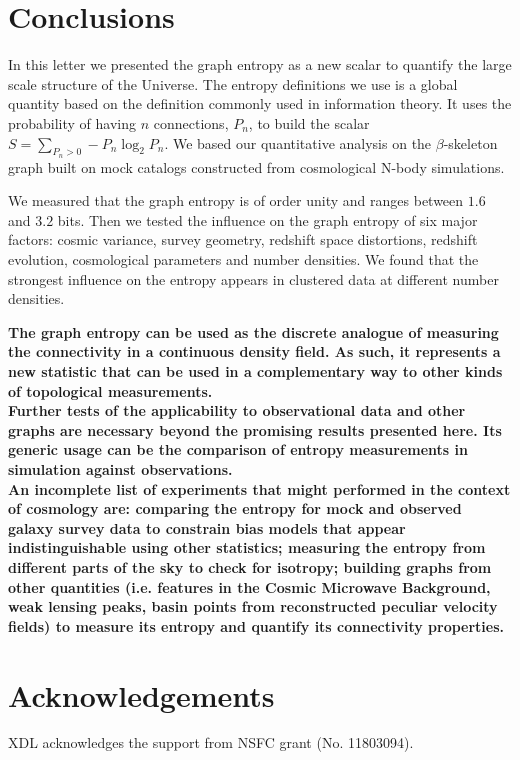 \documentclass[fleqn,usenatbib]{mnras}
\begin{document}
\section{Conclusions}

In this letter we presented the graph entropy as a new scalar to 
quantify the large scale structure of the Universe.
The entropy definitions we use is a global quantity based on 
the definition commonly used in information theory.
It uses the probability of having $n$ connections, $P_n$, to build the 
scalar $S=\sum_{P_n>0} -P_n  \log_2 P_n$. 
We based our quantitative analysis on the $\beta$-skeleton graph 
built on mock catalogs constructed from cosmological N-body simulations.

We measured that the graph entropy is of order unity and ranges 
between $1.6$ and $3.2$ bits.
Then we tested the influence on the graph entropy of six major factors: 
cosmic variance, survey geometry, redshift space distortions, redshift evolution, cosmological parameters and number densities.
We found that the strongest influence on the entropy appears in
clustered data at different number  densities.

\textbf{The graph entropy can be used as the discrete analogue
  of measuring the connectivity in a continuous density field.
  As such, it represents a new statistic that can be used in a complementary way to other kinds of topological measurements.\\
 \indent
 Further tests of the applicability to observational data and other graphs are necessary beyond the  promising results presented here.
 Its generic usage can be the comparison of entropy measurements in simulation against observations.\\
 \indent
 An incomplete list of experiments that might performed in the context of cosmology are:  comparing the entropy for mock and observed galaxy survey data to constrain bias models that appear indistinguishable using other statistics; measuring the entropy from different parts of the sky to check for isotropy; 
building graphs from  other quantities (i.e. features in the Cosmic Microwave Background, weak lensing peaks,
basin points from reconstructed peculiar velocity fields) to measure its entropy and quantify its connectivity properties.
}

\section*{Acknowledgements}
XDL acknowledges the support from NSFC grant (No. 11803094).




\end{document}
